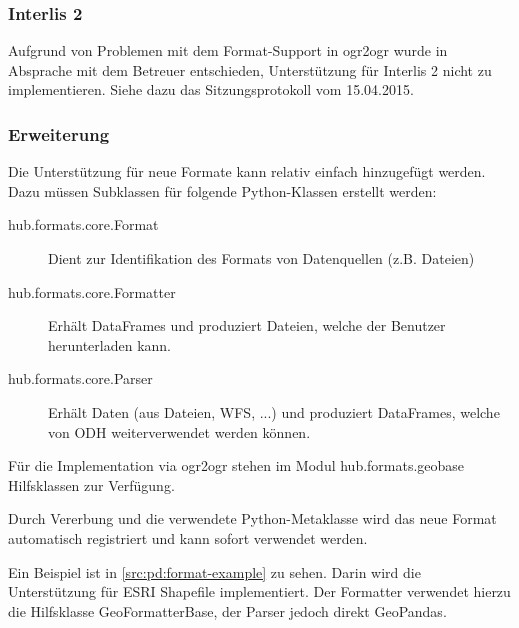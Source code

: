 \subsubsection{Interlis 2}
Aufgrund von Problemen mit dem Format-Support in ogr2ogr wurde in Absprache mit dem Betreuer entschieden, Unterstützung für Interlis 2 nicht zu implementieren. Siehe dazu das Sitzungsprotokoll vom 15.04.2015.

\subsubsection{Erweiterung}
Die Unterstützung für neue Formate kann relativ einfach hinzugefügt werden. Dazu müssen Subklassen für folgende Python-Klassen erstellt werden:

\begin{description}
\item[hub.formats.core.Format] Dient zur Identifikation des Formats von Datenquellen (z.B. Dateien)
\item[hub.formats.core.Formatter] Erhält DataFrames und produziert Dateien, welche der Benutzer herunterladen kann.
\item[hub.formats.core.Parser] Erhält Daten (aus Dateien, WFS, ...) und produziert DataFrames, welche von ODH weiterverwendet werden können.
\end{description}

Für die Implementation via ogr2ogr stehen im Modul hub.formats.geobase Hilfsklassen zur Verfügung.

Durch Vererbung und die verwendete Python-Metaklasse wird das neue Format automatisch registriert und kann sofort verwendet werden.

Ein Beispiel ist in \cref{src:pd:format-example} zu sehen. Darin wird die Unterstützung für ESRI Shapefile implementiert. Der Formatter verwendet hierzu die Hilfsklasse GeoFormatterBase, der Parser jedoch direkt GeoPandas.

